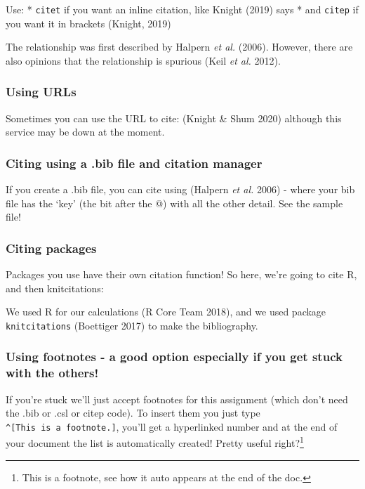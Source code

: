 \documentclass[]{article}
\let\rmarkdownfootnote\footnote%
\def\footnote{\protect\rmarkdownfootnote}
\begin{document}
Use: * \texttt{citet} if you want an inline citation, like Knight (2019)
says * and \texttt{citep} if you want it in brackets (Knight, 2019)

The relationship was first described by Halpern \emph{et al.} (2006).
However, there are also opinions that the relationship is spurious (Keil
\emph{et al.} 2012).

\hypertarget{using-urls}{%
\subsubsection{Using URLs}\label{using-urls}}

Sometimes you can use the URL to cite: (Knight \& Shum 2020) although
this service may be down at the moment.

\hypertarget{citing-using-a-.bib-file-and-citation-manager}{%
\subsubsection{Citing using a .bib file and citation
manager}\label{citing-using-a-.bib-file-and-citation-manager}}

If you create a .bib file, you can cite using (Halpern \emph{et al.}
2006) - where your bib file has the `key' (the bit after the @) with all
the other detail. See the sample file!

\hypertarget{citing-packages}{%
\subsubsection{Citing packages}\label{citing-packages}}

Packages you use have their own citation function! So here, we're going
to cite R, and then knitcitations:

We used R for our calculations (R Core Team 2018), and we used package
\texttt{knitcitations} (Boettiger 2017) to make the bibliography.

\hypertarget{using-footnotes---a-good-option-especially-if-you-get-stuck-with-the-others}{%
\subsubsection{Using footnotes - a good option especially if you get
stuck with the
others!}\label{using-footnotes---a-good-option-especially-if-you-get-stuck-with-the-others}}

If you're stuck we'll just accept footnotes for this assignment (which
don't need the .bib or .csl or citep code). To insert them you just type
\texttt{\^{}{[}This\ is\ a\ footnote.{]}}, you'll get a hyperlinked
number and at the end of your document the list is automatically
created! Pretty useful right?\footnote{This is a footnote, see how it
  auto appears at the end of the doc.}
\end{document}
